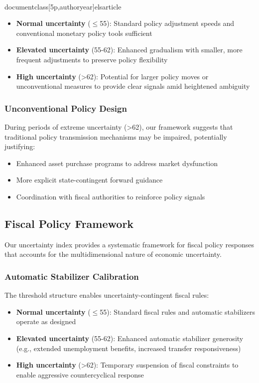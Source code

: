 \\documentclass[5p,authoryear]{elsarticle}
\begin{document}
{\begin{itemize}
    \item \textbf{Normal uncertainty} ($\leq$55): Standard policy adjustment speeds and conventional monetary policy tools sufficient
    \item \textbf{Elevated uncertainty} (55-62): Enhanced gradualism with smaller, more frequent adjustments to preserve policy flexibility
    \item \textbf{High uncertainty} (>62): Potential for larger policy moves or unconventional measures to provide clear signals amid heightened ambiguity
\end{itemize}

\subsubsection{Unconventional Policy Design}
During periods of extreme uncertainty (>62), our framework suggests that traditional policy transmission mechanisms may be impaired, potentially justifying:

\begin{itemize}
    \item Enhanced asset purchase programs to address market dysfunction
    \item More explicit state-contingent forward guidance
    \item Coordination with fiscal authorities to reinforce policy signals
\end{itemize}

\subsection{Fiscal Policy Framework}

Our uncertainty index provides a systematic framework for fiscal policy responses that accounts for the multidimensional nature of economic uncertainty.

\subsubsection{Automatic Stabilizer Calibration}
The threshold structure enables uncertainty-contingent fiscal rules:

\begin{itemize}
    \item \textbf{Normal uncertainty} ($\leq$55): Standard fiscal rules and automatic stabilizers operate as designed
    \item \textbf{Elevated uncertainty} (55-62): Enhanced automatic stabilizer generosity (e.g., extended unemployment benefits, increased transfer responsiveness)
    \item \textbf{High uncertainty} (>62): Temporary suspension of fiscal constraints to enable aggressive countercyclical response
\end{itemize}

}
\end{document}
